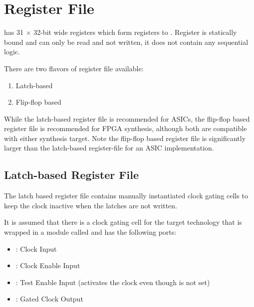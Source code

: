 \chapter{Register File}
\label{chap:rf}

\rvcore has 31 $\times$ 32-bit wide registers which form registers  to
. Register  is statically bound  and can only be
read and not written, it does not contain any sequential logic.

There are two flavors of register file available:

\begin{enumerate}
  \item Latch-based
  \item Flip-flop based
\end{enumerate}

While the latch-based register file is recommended for ASICs, the flip-flop
based register file is recommended for FPGA synthesis, although both are
compatible with either synthesis target.
Note the flip-flop based register file is significantly larger than the
latch-based register-file for an ASIC implementation.

\section{Latch-based Register File}
The latch based register file contains manually instantiated clock gating cells
to keep the clock inactive when the latches are not written.

It is assumed that there is a clock gating cell for the target technology that
is wrapped in a module called  and has the following
ports:
\begin{itemize}
  \item {}: Clock Input
  \item {}: Clock Enable Input
  \item {}: Test Enable Input (activates the clock even though
   is not set)
  \item {}: Gated Clock Output
\end{itemize}
